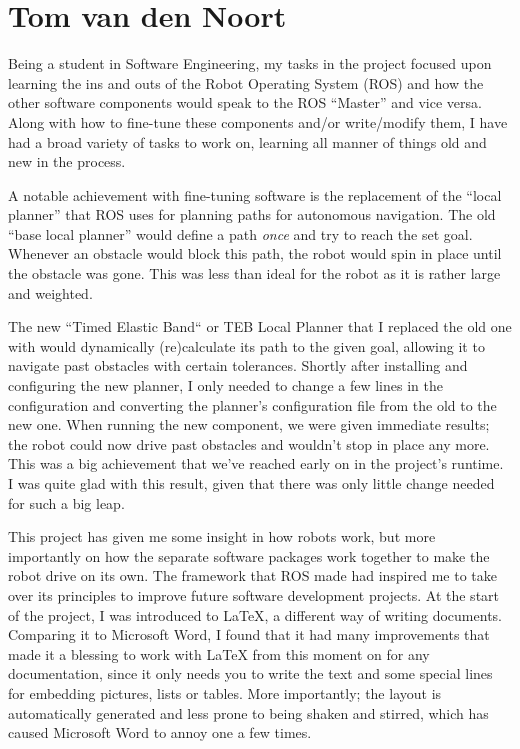 \section{Tom van den Noort}

Being a student in Software Engineering, my tasks in the project focused upon learning the ins and outs of the Robot Operating System (ROS) and how the other software components would speak to the ROS ``Master'' and vice versa. 
Along with how to fine-tune these components and/or write/modify them, I have had a broad variety of tasks to work on, learning all manner of things old and new in the process.

\vspace{5mm}

A notable achievement with fine-tuning software is the replacement of the ``local planner'' that ROS uses for planning paths for autonomous navigation. 
The old ``base local planner'' would define a path \textit{once} and try to reach the set goal. 
Whenever an obstacle would block this path, the robot would spin in place until the obstacle was gone. 
This was less than ideal for the robot as it is rather large and weighted.

The new ``Timed Elastic Band`` or TEB Local Planner that I replaced the old one with would dynamically (re)calculate its path to the given goal, allowing it to navigate past obstacles with certain tolerances. 
Shortly after installing and configuring the new planner, I only needed to change a few lines in the configuration and converting the planner's configuration file from the old to the new one. 
When running the new component, we were given immediate results; the robot could now drive past obstacles and wouldn't stop in place any more. 
This was a big achievement that we've reached early on in the project's runtime. 
I was quite glad with this result, given that there was only little change needed for such a big leap.

\vspace{5mm}

This project has given me some insight in how robots work, but more importantly on how the separate software packages work together to make the robot drive on its own. 
The framework that ROS made had inspired me to take over its principles to improve future software development projects. 
At the start of the project, I was introduced to LaTeX, a different way of writing documents. 
Comparing it to Microsoft Word, I found that it had many improvements that made it a blessing to work with LaTeX from this moment on for any documentation, since it only needs you to write the text and some special lines for embedding pictures, lists or tables. 
More importantly; the layout is automatically generated and less prone to being shaken and stirred, which has caused Microsoft Word to annoy one a few times.

